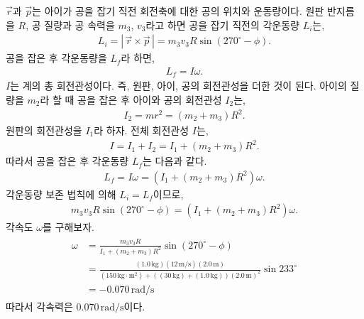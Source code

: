 \documentclass[floatfix,nofootinbib,superscriptaddress,fleqn]{revtex4-2}
\begin{document}
$\vec{r}$과 $\vec{p}$는 아이가 공을 잡기 직전 회전축에 대한 공의 위치와 운동량이다.
원판 반지름을 $R$, 
공 질량과  공 속력을 $m_3$, $v_3$라고 하면 공을 잡기 직전의 각운동량 $L_i$는,
\begin{align}
  L_i =|\,\vec{r}\times\vec{p}\,|
  = m_3v_3R\sin\left(270^\circ-\phi\right).
\end{align}
공을 잡은 후 각운동량을 $L_f$라 하면,
\begin{align}
  L_f = I\omega.
\end{align}
$I$는 계의 총 회전관성이다. 즉, 원판, 아이, 공의 회전관성을 더한 것이 된다.
아이의 질량을 $m_2$라 할 때 
공을 잡은 후 아이와 공의 회전관성 $I_2$는,
\begin{align}
  I_2 = mr^2 = (m_2+m_3)R^2.
\end{align} 
원판의 회전관성을 $I_1$라 하자. 전체 회전관성 $I$는,
\begin{align}
  I = I_1 + I_2 = I_1+(m_2+m_3)R^2.
\end{align}
따라서 공을 잡은 후 각운동량 $L_f$는 다음과 같다.
\begin{align}
  L_f = I\omega = (I_1+(m_2+m_3)R^2)\omega.
\end{align}
각운동량 보존 법칙에 의해 $L_i = L_f$이므로,
\begin{align}
  m_3v_3R\sin\left(270^\circ-\phi\right)
  =(I_1+(m_2+m_3)R^2)\omega.
\end{align} 
각속도 $\omega$를 구해보자.
\begin{align}
  \begin{split}
    \omega &= \frac{m_3v_3R}{I_1+(m_2+m_3)R^2}
    \sin\left(270^\circ-\phi\right)  \\
    &= \frac{(1.0\,\mathrm{kg})(12\,\mathrm{m/s})(2.0\,\mathrm{m})}
    {(150\,\mathrm{kg\cdot m^2})
    +((30\,\mathrm{kg})+(1.0\,\mathrm{kg}))(2.0\,\mathrm{m})^2}
    \sin 233^\circ \\
   &=-0.070\,\mathrm{rad/s}
  \end{split}
\end{align}
따라서 각속력은 $0.070\,\mathrm{rad/s}$이다.
\vspace{1.cm}
\end{document}
